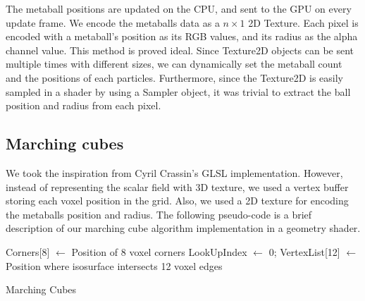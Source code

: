 \documentclass{article}
\begin{document}
\begin{multicols}{2}
        The metaball positions are updated on the CPU, and sent to the GPU on every update frame. We encode the metaballs data as a $n\times1$ 2D Texture. Each pixel is encoded with a metaball's position as its RGB values, and its radius as the alpha channel value. This method is proved ideal. Since Texture2D objects can be sent multiple times with different sizes, we can dynamically set the metaball count and the positions of each particles. Furthermore, since the Texture2D is easily sampled in a shader by using a Sampler object, it was trivial to extract the ball position and radius from each pixel.

        \subsection{Marching cubes}
        	We took the inspiration from Cyril Crassin's GLSL implementation. \cite{crassin} However, instead of representing the scalar field with 3D texture, we used a vertex buffer storing each voxel position in the grid. Also, we used a 2D texture for encoding the metaballs position and radius. The following pseudo-code is a brief description of our marching cube algorithm implementation in a geometry shader.
        	
			\begin{algorithm}[H]
				Corners[8] $\leftarrow$ Position of 8 voxel corners\;
				LookUpIndex $\leftarrow$ 0;
				VertexList[12] $\leftarrow$ Position where isosurface intersects 12 voxel edges\;
				\caption{Marching Cubes}
			\end{algorithm}
        	

\end{multicols}
\end{document}
